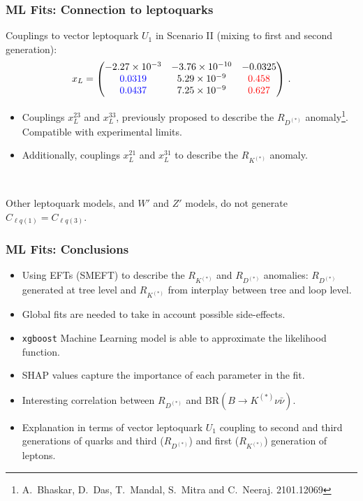 \documentclass[mathserif, 10pt]{beamer}
\begin{document}
\begin{frame}\frametitle{ML Fits: Connection to leptoquarks}

    Couplings to vector leptoquark $U_1$ in Scenario II (mixing to first and second generation):
    $$x_L = \begin{pmatrix}
            -2.27\times10^{-3}   & -3.76\times 10^{-10} & -0.0325            \\
            {\color{blue}0.0319} & 5.29\times 10^{-9}   & {\color{red}0.458} \\
            {\color{blue}0.0437} & 7.25\times 10^{-9}   & {\color{red}0.627}
        \end{pmatrix}\,.
    $$
    \begin{itemize}
        \item Couplings {\color{red}$x_L^{23}$} and {\color{red}$x_L^{33}$}, previously proposed to describe the $R_{D^{(*)}}$ anomaly\footnote[17]{A.~Bhaskar, D.~Das, T.~Mandal, S.~Mitra and C.~Neeraj. 2101.12069}. Compatible with experimental limits.
        \item Additionally, couplings {\color{blue}$x_L^{21}$} and {\color{blue}$x_L^{31}$} to describe the $R_{K^{(*)}}$ anomaly.
    \end{itemize}

    ~

    Other leptoquark models, and $W'$ and $Z'$ models, do not generate $C_{\ell q(1)} = C_{\ell q (3)}$.
\end{frame}

\begin{frame}\frametitle{ML Fits: Conclusions}

    \begin{itemize}
        \item Using EFTs (SMEFT) to describe the $R_{K^{(*)}}$ and $R_{D^{(*)}}$ anomalies: $R_{D^{(*)}}$ generated at tree level and $R_{K^{(*)}}$ from interplay between tree and loop level.
        \item Global fits are needed to take in account possible side-effects.
        \item \texttt{xgboost} Machine Learning model is able to approximate the likelihood function.
        \item SHAP values capture the importance of each parameter in the fit.
        \item Interesting correlation between $R_{D^{(*)}}$ and $\mathrm{BR}(B\to K^{(*)}\nu\bar{\nu})$.
        \item Explanation in terms of vector leptoquark $U_1$ coupling to second and third generations of quarks and third ($R_{D^{(*)}}$) and first ($R_{K^{(*)}}$) generation of leptons.
    \end{itemize}

\end{frame}
\end{document}
